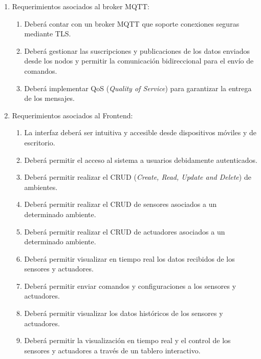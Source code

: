 \begin{enumerate}
	\item Requerimientos asociados al broker MQTT:
	      \begin{enumerate}
		      \item Deberá contar con un broker MQTT que soporte conexiones seguras mediante TLS.
		      \item Deberá gestionar las suscripciones y publicaciones de los datos enviados desde
		            los nodos y permitir la comunicación bidireccional para el envío de comandos.
		      \item Deberá implementar QoS (\textit{Quality of Service}) para garantizar la entrega
		            de los mensajes.
	      \end{enumerate}

	\item Requerimientos asociados al Frontend:
	      \begin{enumerate}
		      \item La interfaz deberá ser intuitiva y accesible desde dispositivos móviles y de
		            escritorio.
		      \item Deberá permitir el acceso al sistema a usuarios debidamente autenticados.
		      \item Deberá permitir realizar el CRUD (\textit{Create, Read, Update and Delete}) de
		            ambientes.
		      \item Deberá permitir realizar el CRUD de sensores asociados a un determinado
		            ambiente.
		      \item Deberá permitir realizar el CRUD de actuadores asociados a un determinado
		            ambiente.
		      \item Deberá permitir visualizar en tiempo real los datos recibidos de los sensores y
		            actuadores.
		      \item Deberá permitir enviar comandos y configuraciones a los sensores y actuadores.
		      \item Deberá permitir visualizar los datos históricos de los sensores y actuadores.
		      \item Deberá permitir la visualización en tiempo real y el control de los sensores y
		            actuadores a través de un tablero interactivo.
	      \end{enumerate}


\end{enumerate}
